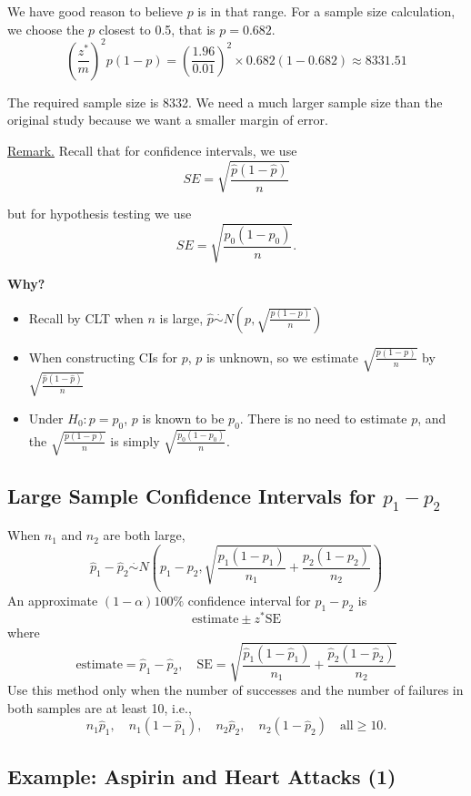 \documentclass[14pt]{extarticle}
\begin{document}
We have good reason to believe \(p\) is in that range. For a sample size calculation, we choose the \(p\) closest to 0.5, that is \(p = 0.682\).
\[
\left( \frac{z^*}{m} \right)^2 p(1 - p) = \left( \frac{1.96}{0.01} \right)^2 \times 0.682(1 - 0.682) \approx 8331.51
\]

The required sample size is 8332. We need a much larger sample size than the original study because we want a smaller margin of error.

\underline{Remark.} Recall that for confidence intervals, we use
\[
SE = \sqrt{\frac{\hat{p}(1 - \hat{p})}{n}}
\]

but for hypothesis testing we use
\[
SE = \sqrt{\frac{p_0 (1 - p_0)}{n}}.
\]

\noindent \textbf{Why?}
\begin{itemize}
    \item Recall by CLT when \(n\) is large, \(\hat{p} \overset{\cdot}{\sim} N(p, \sqrt{\frac{p(1 - p)}{n}})\)
    \item When constructing CIs for \(p\), \(p\) is unknown, so we estimate \(\sqrt{\frac{p(1 - p)}{n}}\) by \(\sqrt{\frac{\hat{p}(1 - \hat{p})}{n}}\)
    \item Under \(H_0: p = p_0\), \(p\) is known to be \(p_0\). There is no need to estimate \(p\), and the \(\sqrt{\frac{p(1 - p)}{n}}\) is simply \(\sqrt{\frac{p_0(1 - p_0)}{n}}\).
\end{itemize}

\subsection*{Large Sample Confidence Intervals for \( p_1 - p_2 \)}

When \( n_1 \) and \( n_2 \) are both large, 
\[
\hat{p}_1 - \hat{p}_2 \overset{\cdot}{\sim} N \left( p_1 - p_2, \sqrt{\frac{p_1(1 - p_1)}{n_1} + \frac{p_2(1 - p_2)}{n_2}} \right)
\]
An approximate \( (1 - \alpha)100\%\) confidence interval for \( p_1 - p_2 \) is 
\[
\text{estimate} \pm z^* \text{SE}
\]
where 
\[
\text{estimate} = \hat{p}_1 - \hat{p}_2, \quad \text{SE} = \sqrt{\frac{\hat{p}_1(1 - \hat{p}_1)}{n_1} + \frac{\hat{p}_2(1 - \hat{p}_2)}{n_2}}
\]
Use this method only when the number of successes and the number of failures in both samples are at least 10, i.e., 
\[
n_1 \hat{p}_1, \quad n_1(1 - \hat{p}_1), \quad n_2 \hat{p}_2, \quad n_2(1 - \hat{p}_2) \quad \text{all} \geq 10.
\]

\subsection*{Example: Aspirin and Heart Attacks (1)}
\end{document}

